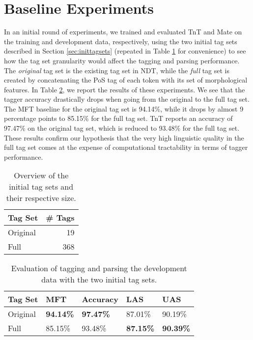 \documentclass[a4paper,12pt,english]{book}
\begin{document}
\section{Baseline Experiments}
\label{sec:baselineexp}
In an initial round of experiments, we trained and evaluated TnT and Mate on
the training and development data, respectively, using the two initial tag sets
described in Section \ref{sec:inittagsets} (repeated in Table
\ref{repndttagsets} for convenience) to see how the tag set granularity would
affect the tagging and parsing performance. The \emph{original} tag set is the
existing tag set in NDT, while the \emph{full} tag set is created by
concatenating the PoS tag of each token with its set of morphological features.
In Table \ref{inittagseteval}, we report the results of these experiments. We
see that the tagger accuracy drastically drops when going from the original to
the full tag set. The MFT baseline for the original tag set is 94.14\%, while
it drops by almost 9 percentage points to 85.15\% for the full tag set. TnT
reports an accuracy of 97.47\% on the original tag set, which is reduced to
93.48\% for the full tag set. These results confirm our hypothesis that the
very high linguistic quality in the full tag set comes at the expense of
computational tractability in terms of tagger performance.

\begin{table}
    \centering
    \smaller[0.5]
    \begin{tabular}{@{}lr@{}}
        \toprule
        \textbf{Tag Set} & \textbf{\# Tags} \\
        \midrule
        Original & 19 \\
        Full & 368 \\
        \bottomrule
    \end{tabular}
    \caption{Overview of the initial tag sets and their respective size.}
    \label{repndttagsets}
\end{table}

\begin{table}
    \vspace{1ex}
    \centering
    \smaller[0.5]
    \begin{tabular}{@{}lllll@{}}
        \toprule
        \textbf{Tag Set} & \textbf{MFT} & \textbf{Accuracy} &
        \textbf{LAS} & \textbf{UAS} \\
        \midrule
        Original & \textbf{94.14\%} & \textbf{97.47\%} & 87.01\% & 90.19\% \\
        Full & 85.15\% & 93.48\% & \textbf{87.15\%} & \textbf{90.39\%} \\
        \bottomrule
    \end{tabular}
    \caption{Evaluation of tagging and parsing the development data with the two
        initial tag sets.}
    \label{inittagseteval}
\end{table}
\end{document}
